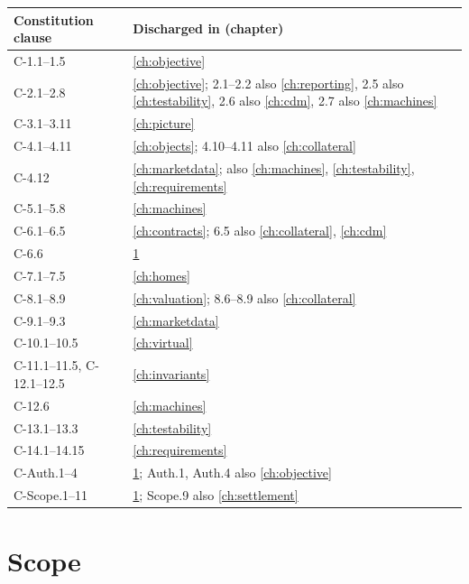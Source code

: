 \documentclass[11pt,a4paper]{article}
\begin{document}
\begin{center}\small
\begin{tabular}{@{}ll@{}}
\toprule
Constitution clause & Discharged in (chapter) \\
\midrule
C-1.1--1.5 & \ref{ch:objective} \\
C-2.1--2.8 & \ref{ch:objective}; 2.1--2.2 also \ref{ch:reporting}, 2.5 also \ref{ch:testability}, 2.6 also \ref{ch:cdm}, 2.7 also \ref{ch:machines} \\
C-3.1--3.11 & \ref{ch:picture} \\
C-4.1--4.11 & \ref{ch:objects}; 4.10--4.11 also \ref{ch:collateral} \\
C-4.12 & \ref{ch:marketdata}; also \ref{ch:machines}, \ref{ch:testability}, \ref{ch:requirements} \\
C-5.1--5.8 & \ref{ch:machines} \\
C-6.1--6.5 & \ref{ch:contracts}; 6.5 also \ref{ch:collateral}, \ref{ch:cdm} \\
C-6.6 & \ref{ch:scope} \\
C-7.1--7.5 & \ref{ch:homes} \\
C-8.1--8.9 & \ref{ch:valuation}; 8.6--8.9 also \ref{ch:collateral} \\
C-9.1--9.3 & \ref{ch:marketdata} \\
C-10.1--10.5 & \ref{ch:virtual} \\
C-11.1--11.5, C-12.1--12.5 & \ref{ch:invariants} \\
C-12.6 & \ref{ch:machines} \\
C-13.1--13.3 & \ref{ch:testability} \\
C-14.1--14.15 & \ref{ch:requirements} \\
C-Auth.1--4 & \ref{ch:scope}; Auth.1, Auth.4 also \ref{ch:objective} \\
C-Scope.1--11 & \ref{ch:scope}; Scope.9 also \ref{ch:settlement} \\
\bottomrule
\end{tabular}
\end{center}

\section{Scope}\label{ch:scope}
\end{document}
